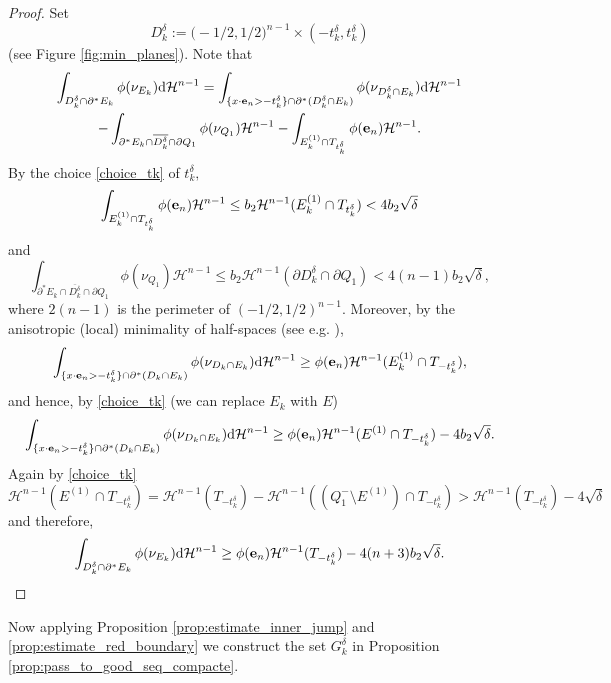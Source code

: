 \documentclass[reqno]{amsart}
\numberwithin{equation}{section}
\theoremstyle{plain}
\theoremstyle{definition}
\newcommand{\cH}{\mathcal{H}}
\newcommand{\p}{\partial}
\newcommand{\cl}[1]{\overline{#1}}
\newcommand{\bound}{b}
\renewcommand{\d}{\mathrm{d}}
\newcommand{\e}{{\bf e}}
\begin{document}
\begin{proof}
Set
$$
D_k^\delta:= \big(-1/2,1/2\big)^{n-1}\times (-t_k^\delta,t_k^\delta) 
$$
(see Figure \ref{fig:min_planes}).
%
Note that 
\begin{multline*}
\int_{D_k^\delta \cap \p^* E_k} \phi(\nu_{E_k})\d\cH^{n-1} =
\int_{\{x\cdot \e_n>-t_k^\delta\}\cap\p^*(D_k^\delta\cap E_k)} \phi(\nu_{D_k^\delta\cap E_k})\d\cH^{n-1} \\
- \int_{\p^*E_k \cap \cl{D_k^\delta}\cap \p Q_1}\phi(\nu_{Q_1})\cH^{n-1} -
\int_{E_k^{(1)}\cap T_{t_k^\delta}}\phi(\e_n)\cH^{n-1}.
\end{multline*}
By the choice \eqref{choice_tk} of $t_k^\delta,$
$$
\int_{E_k^{(1)}\cap T_{t_k^\delta}}\phi(\e_n)\cH^{n-1} \le \bound_2 \cH^{n-1}(E_k^{(1)}\cap T_{t_k^\delta}) < 4\bound_2\sqrt{\delta} 
$$
and 
$$
\int_{\p^*E_k \cap \cl{D_k^\delta}\cap \p Q_1}\phi(\nu_{Q_1})\cH^{n-1} \le 
\bound_2\cH^{n-1}(\p D_k^\delta \cap \p Q_1) < 4(n-1)\bound_2\sqrt{\delta},
$$
where $2(n-1)$ is the perimeter of $(-1/2,1/2)^{n-1}.$
Moreover, by the anisotropic (local) minimality of half-spaces (see e.g. \cite[Example 2.4]{BNH:2017}),
$$
\int_{\{x\cdot \e_n>-t_k^\delta\}\cap \p^*(D_k\cap E_k)} \phi(\nu_{D_k\cap E_k})\d\cH^{n-1} \ge \phi(\e_n)\cH^{n-1}(E_k^{(1)}\cap T_{-t_k^\delta}), 
$$ 
and hence, by \eqref{choice_tk} (we can replace $E_k$ with 
$E$)
$$
\int_{\{x\cdot \e_n>-t_k^\delta\}\cap \p^*(D_k\cap E_k)} \phi(\nu_{D_k\cap E_k})\d\cH^{n-1} \ge \phi(\e_n)\cH^{n-1}(E^{(1)}\cap T_{-t_k^\delta}) - 4\bound_2\sqrt{\delta}. 
$$
Again by \eqref{choice_tk}
$$
\cH^{n-1}(E^{(1)}\cap T_{-t_k^\delta}) = 
\cH^{n-1}(T_{-t_k^\delta}) - \cH^{n-1}((Q_1^- \setminus E^{(1)})\cap T_{-t_k^\delta}) >\cH^{n-1}(T_{-t_k^\delta}) -4\sqrt{\delta} 
$$
and therefore,
$$
\int_{D_k^\delta\cap\p^*E_k} \phi(\nu_{E_k})\d\cH^{n-1} \ge \phi(\e_n)\cH^{n-1}(T_{-t_k^\delta}) - 4(n+3)\bound_2\sqrt{\delta}.
$$
\end{proof}


Now applying Proposition \ref{prop:estimate_inner_jump} and \ref{prop:estimate_red_boundary} we construct the set $G_k^\delta$ in Proposition \ref{prop:pass_to_good_seq_compacte}.
\end{document}
